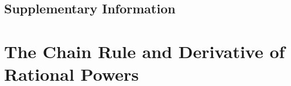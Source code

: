 \documentclass{fts_m2}
\begin{document}
    \subsection*{Supplementary Information}
    

    \section{The Chain Rule and Derivative of Rational Powers}
    

\end{document}
